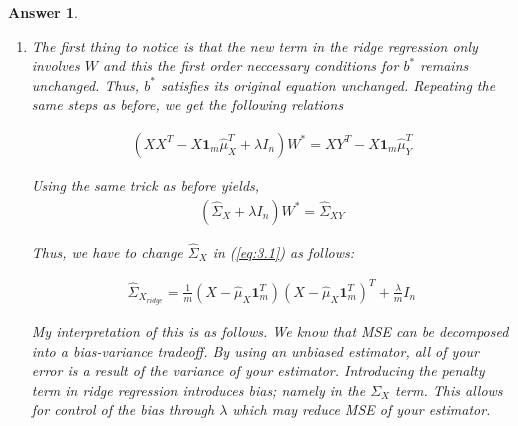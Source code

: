\documentclass[12pt]{article}
\theoremstyle{colon}
\newtheorem*{answer}{Answer}
\begin{document}
\begin{answer}
\begin{enumerate}[label=\alph*)]
      Dividing both sides by $m$ yields the result,
      \begin{gather*}
        \hat{\Sigma}_X W^* = \hat{\Sigma}_{XY}
      \end{gather*}

    \item The first thing to notice is that the new term in the ridge regression only involves $W$ and this the first order neccessary conditions for $b^*$ remains unchanged. Thus, $b^*$ satisfies its original equation unchanged. Repeating the same steps as before, we get the following relations

      \begin{gather*}
        (XX^T - X \bm{1}_m \hat{\mu}_X^T + \lambda I_n) W^* = XY^T - X \bm{1}_m \hat{\mu}_Y^T
      \end{gather*}

      Using the same trick as before yields,
      \begin{gather*}
        (\hat{\Sigma}_X + \lambda I_n) W^* = \hat{\Sigma}_{XY}
      \end{gather*}

      Thus, we have to change $\hat{\Sigma}_X$ in (\ref{eq:3.1}) as follows:

      \begin{gather*}
        \hat{\Sigma}_{X_{ridge}} = \frac{1}{m} (X - \hat{\mu}_X \bm{1}_m^T)(X - \hat{\mu}_X \bm{1}_m^T)^T + \frac{\lambda}{m} I_n
      \end{gather*}

      My interpretation of this is as follows. We know that MSE can be decomposed into a bias-variance tradeoff. By using an unbiased estimator, all of your error is a result of the variance of your estimator. Introducing the penalty term in ridge regression introduces bias; namely in the $\Sigma_X$ term. This allows for control of the bias through $\lambda$ which may reduce MSE of your estimator.
  \end{enumerate}
\end{answer}

\clearpage
\end{document}
